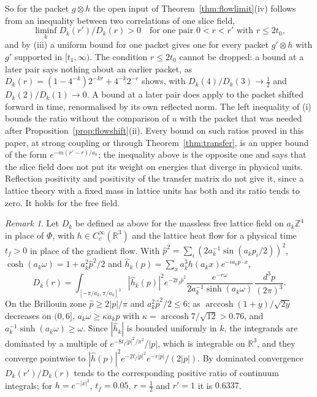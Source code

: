 \documentclass[11pt]{amsart}
\theoremstyle{definition}
\theoremstyle{remark}
\newtheorem{remark}[theorem]{Remark}
\numberwithin{equation}{section}
\newcommand{\R}{\mathbb{R}}
\newcommand{\Z}{\mathbb{Z}}
\begin{document}
So for the packet $g\otimes h$ the open input of
Theorem~\ref{thm:flowlimit}(iv) follows from an inequality between two
correlations of one slice field,
\[
\liminf_kD_k(r')/D_k(r)>0\quad\text{for one pair }0<r<r'\text{ with }r\le2t_0,
\]
and by (iii) a uniform bound for one packet gives one for every packet
$g'\otimes h$ with $g'$ supported in $[t_1,\infty)$. The condition $r\le2t_0$
cannot be dropped: a bound at a later pair says nothing about an earlier
packet, as $D_k(r)=(1-4^{-k})2^{-kr}+4^{-k}2^{-r}$ shows, with
$D_k(4)/D_k(3)\to\frac12$ and $D_k(2)/D_k(1)\to0$. A bound at a later pair
does apply to the packet shifted forward in time, renormalised by its own
reflected norm. The left inequality of
(i) bounds the ratio without the comparison of $u$ with the packet that was
needed after Proposition~\ref{prop:flowshift}(ii). Every bound on such ratios
proved in this paper, at strong coupling or through
Theorem~\ref{thm:transfer}, is an upper bound of the form
$e^{-m(r'-r)/a_k}$; the inequality above is the opposite one and says
that the slice field does not put its weight on energies that diverge in
physical units. Reflection positivity and positivity of the transfer matrix
do not give it, since a lattice theory with a fixed mass in lattice units has
both and its ratio tends to zero. It holds for the free field.

\enlargethispage{2pt}
\begin{remark}\label{rem:freeslice}
Let $D_k$ be defined as above for the massless free lattice field on
$a_k\Z^4$ in place of $\Phi$, with $h\in C^\infty_c(\R^3)$ and the lattice heat
flow for a physical time $t_f>0$ in place of the gradient flow. With $\hat p^2=\sum_i(2a_k^{-1}\sin
(a_kp_i/2))^2$, $\cosh(a_k\omega)=1+a_k^2\hat p^2/2$ and
$\hat h_k(p)=\sum_xa_k^3h(a_kx)e^{-ia_kp\cdot x}$,
\[
D_k(r)=\int_{[-\pi/a_k,\pi/a_k]^3}|\hat h_k(p)|^2e^{-2t_f\hat p^2}
\frac{e^{-r\omega}}{2a_k^{-1}\sinh(a_k\omega)}\,\frac{d^3p}{(2\pi)^3} .
\]
On the Brillouin zone $\hat p\ge2|p|/\pi$ and $a_k^2\hat p^2/2\le6$; as
$\operatorname{arccosh}(1+y)/\sqrt{2y}$ decreases on $(0,6]$, $a_k\omega\ge
\kappa a_k\hat p$ with $\kappa=\operatorname{arccosh}7/\sqrt{12}>0.76$, and
$a_k^{-1}\sinh(a_k\omega)\ge\omega$. Since $|\hat h_k|$ is bounded
uniformly in $k$, the integrands are dominated by a multiple of
$e^{-8t_f|p|^2/\pi^2}/|p|$, which is integrable on $\R^3$, and they
converge pointwise to $|\hat h(p)|^2e^{-2t_f|p|^2}e^{-r|p|}/
(2|p|)$. By dominated convergence $D_k(r')/D_k(r)$ tends to the
corresponding positive ratio of continuum integrals; for $h=e^{-|x|^2}$,
$t_f=0.05$, $r=\frac12$ and $r'=1$ it is $0.6337$.
\end{remark}
\end{document}
